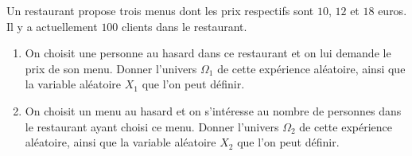 \documentclass[11pt]{article}
\begin{document}
\begin{app}
  Un restaurant propose trois menus dont les prix respectifs sont $10$, $12$ et
  $18$ euros. Il y a actuellement $100$ clients dans le restaurant.
  \begin{enumerate}
    \item On choisit une personne au hasard dans ce restaurant et on lui
      demande le prix de son menu. Donner l'univers $\Omega_1$ de cette
      expérience aléatoire, ainsi que la variable aléatoire $X_1$ que l'on peut
      définir.
    \item On choisit un menu au hasard et on s'intéresse au nombre de personnes
      dans le restaurant ayant choisi ce menu. Donner l'univers $\Omega_2$ de
      cette expérience aléatoire, ainsi que la variable aléatoire $X_2$ que l'on
      peut définir.
  \end{enumerate}
\end{app}
\end{document}
